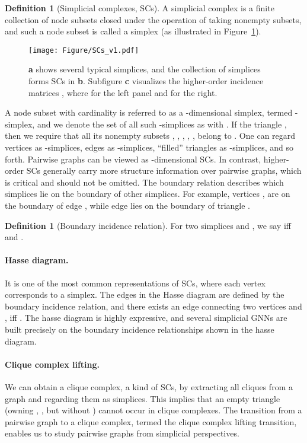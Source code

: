\documentclass[letterpaper]{article} \usepackage{aaai24}
\theoremstyle{plain}
\theoremstyle{definition}
\newtheorem{definition}[theorem]{Definition}
\theoremstyle{remark}
\begin{document}
\begin{definition}[Simplicial complexes, SCs]
A simplicial complex  is a finite collection of node subsets closed under the operation of taking nonempty subsets, and such a node subset  is called a simplex (as illustrated in Figure~\ref{fig:SCs}). 
\end{definition}

\begin{figure}[!ht]
\centering
\texttt{[image: Figure/SCs\_v1.pdf]}
\caption{ \textbf{a} shows several typical simplices, and the collection of simplices forms SCs in \textbf{b}. Subfigure \textbf{c} visualizes the higher-order incidence matrices , where  for the left panel and  for the right.}
\label{fig:SCs}
\end{figure}


A node subset  with cardinality  is referred to as a -dimensional simplex, termed -simplex, and we denote the set of all such -simplices as  with .
If the triangle , then we require that all its nonempty subsets , , , , ,  belong to .  One can regard vertices as -simplices, edges as -simplices, “filled” triangles as -simplices, and so forth. 
Pairwise graphs can be viewed as -dimensional SCs. In contrast, higher-order SCs generally carry more structure information over pairwise graphs, which is critical and should not be omitted.
The boundary relation describes which simplices lie on the boundary of other simplices. For example, vertices ,  are on the boundary of edge , while edge  lies on the boundary of triangle .


\begin{definition}[Boundary incidence relation]
For two simplices  and , we say  iff  and .
\end{definition}




\paragraph{Hasse diagram.} It is one of the most common representations of SCs, where each vertex corresponds to a simplex. 
The edges in the Hasse diagram are defined by the boundary incidence relation, and there exists an edge connecting two vertices  and , iff .
The hasse diagram is highly expressive, and several simplicial GNNs \cite{SCoNe21Roddenberry, SWL2021, GMPS22} are built precisely on the boundary incidence relationships shown in the hasse diagram. 

\paragraph{Clique complex lifting.} 
We can obtain a clique complex, a kind of SCs, by extracting all cliques from a graph and regarding them as simplices. 
This implies that an empty triangle (owning , ,  but without ) cannot occur in clique complexes.
The transition from a pairwise graph to a clique complex, termed the clique complex lifting transition, enables us to study pairwise graphs from simplicial perspectives.
\end{document}
